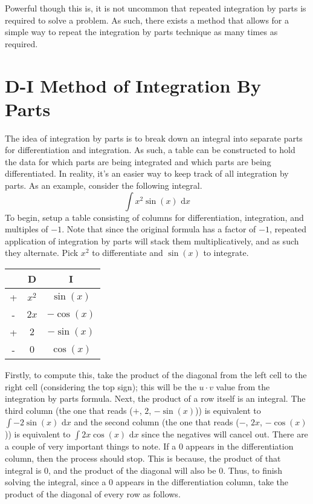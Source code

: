 \documentclass[oneside]{book}
\newcommand\tab[1][1cm]{\hspace*{#1}}
\newcommand\nextline{\newline\tab}
\newcommand\thm[2]{\section{#1}\label{sec:#2}}
\renewcommand\d[1]{\text{ d}#1}
\begin{document}
\tab
Powerful though this is, it is not uncommon that repeated integration by parts is required to solve a problem. As such, there exists a method that allows for a simple way to repeat the integration by parts technique as many times as required. 
\thm{D-I Method of Integration By Parts}{IntByPtsDI}
\tab
The idea of integration by parts is to break down an integral into separate parts for differentiation and integration. As such, a table can be constructed to hold the data for which parts are being integrated and which parts are being differentiated. In reality, it's an easier way to keep track of all integration by parts. As an example, consider the following integral.
\begin{equation*}
\int x^2\sin(x)\d{x}
\end{equation*}
\tab
To begin, setup a table consisting of columns for differentiation, integration, and multiples of $-1$. Note that since the original formula has a factor of $-1$, repeated application of integration by parts will stack them multiplicatively, and as such they alternate.
\nextline
Pick $x^2$ to differentiate and $\sin(x)$ to integrate.
\begin{center}
{\renewcommand{\arraystretch}{1.2}
\begin{tabular}{| c | c | c |}
\hline
   & D & I \\
\hline
+ & $x^2$ & $\sin(x)$ \\
\hline
- & $2x$ & $-\cos(x)$ \\
\hline
+ & $2$ & $-\sin(x)$ \\
\hline
- & $0$ & $\cos(x)$ \\
\hline
\end{tabular}
}
\end{center}
\tab
Firstly, to compute this, take the product of the diagonal from the left cell to the right cell (considering the top sign); this will be the $u\cdot v$ value from the integration by parts formula. Next, the product of a row itself is an integral. The third column (the one that reads ($+$, $2$, $-\sin(x)$)) is equivalent to $\int -2\sin(x)\d{x}$ and the second column (the one that reads ($-$, $2x$, $-\cos(x)$)) is equivalent to $\int 2x\cos(x)\d{x}$ since the negatives will cancel out.
\nextline
There are a couple of very important things to note. If a $0$ appears in the differentiation column, then the process should stop. This is because, the product of that integral is 0, and the product of the diagonal will also be 0.
\nextline
Thus, to finish solving the integral, since a $0$ appears in the differentiation column, take the product of the diagonal of every row as follows.
\end{document}
